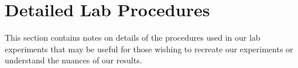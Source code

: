 \chapter{Detailed Lab Procedures}
\label{sec:app-lab}

This section contains notes on details of the procedures used in our lab experiments that may be useful for those wishing to recreate our experiments or understand the nuances of our results.\\


\clearpage
\newpage